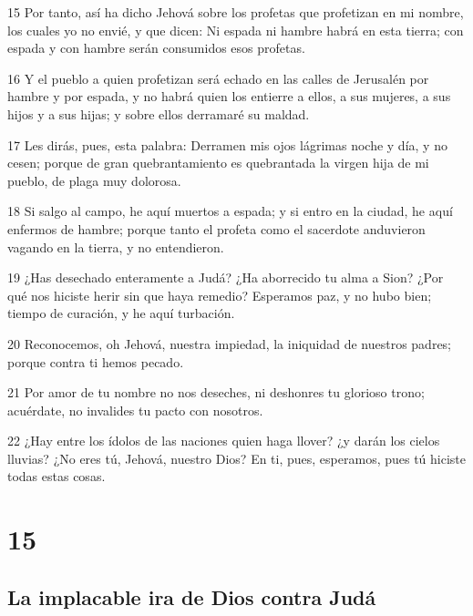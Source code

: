 \par 15 Por tanto, así ha dicho Jehová sobre los profetas que profetizan en mi nombre, los cuales yo no envié, y que dicen: Ni espada ni hambre habrá en esta tierra; con espada y con hambre serán consumidos esos profetas.
\par 16 Y el pueblo a quien profetizan será echado en las calles de Jerusalén por hambre y por espada, y no habrá quien los entierre a ellos, a sus mujeres, a sus hijos y a sus hijas; y sobre ellos derramaré su maldad.
\par 17 Les dirás, pues, esta palabra: Derramen mis ojos lágrimas noche y día, y no cesen; porque de gran quebrantamiento es quebrantada la virgen hija de mi pueblo, de plaga muy dolorosa.
\par 18 Si salgo al campo, he aquí muertos a espada; y si entro en la ciudad, he aquí enfermos de hambre; porque tanto el profeta como el sacerdote anduvieron vagando en la tierra, y no entendieron.
\par 19 ¿Has desechado enteramente a Judá? ¿Ha aborrecido tu alma a Sion? ¿Por qué nos hiciste herir sin que haya remedio? Esperamos paz, y no hubo bien; tiempo de curación, y he aquí turbación.
\par 20 Reconocemos, oh Jehová, nuestra impiedad, la iniquidad de nuestros padres; porque contra ti hemos pecado.
\par 21 Por amor de tu nombre no nos deseches, ni deshonres tu glorioso trono; acuérdate, no invalides tu pacto con nosotros.
\par 22 ¿Hay entre los ídolos de las naciones quien haga llover? ¿y darán los cielos lluvias? ¿No eres tú, Jehová, nuestro Dios? En ti, pues, esperamos, pues tú hiciste todas estas cosas.

\chapter{15}

\section*{La implacable ira de Dios contra Judá}

